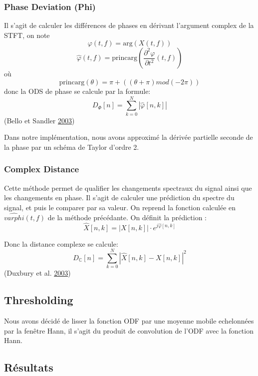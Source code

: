 \documentclass[french,]{article}
\begin{document}
\hypertarget{phase-deviation-phi}{%
\subsubsection{Phase Deviation (Phi)}\label{phase-deviation-phi}}

Il s'agit de calculer les différences de phases en dérivant l'argument
complex de la STFT, on note \[ \varphi(t, f) = \mathrm{arg}(X(t, f)) \]
\[\hat{\varphi}(t, f) = \mathrm{princarg}
\left( \frac{\partial^2 \varphi}{\partial t^2}(t, f)  \right) \] où
\[ \mathrm{princarg}(\theta) = \pi + ((\theta + \pi) mod (-2\pi)) \]
donc la ODS de phase se calcule par la formule:
\[ D_{\Phi}[n] = \sum\limits_{k=0}^{N}\left\lvert \hat{\varphi}[n, k] \right\rvert \]
(Bello et Sandler \protect\hyperlink{ref-phase}{2003})

Dans notre implémentation, nous avons approximé la dérivée partielle
seconde de la phase par un schéma de Taylor d'ordre 2.

\hypertarget{complex-distance}{%
\subsubsection{Complex Distance}\label{complex-distance}}

Cette méthode permet de qualifier les changements spectraux du signal
ainsi que les changements en phase. Il s'agit de calculer une prédiction
du spectre du signal, et puis le comparer par sa valeur. On reprend la
fonction calculée en \(\hat{varphi}(t, f)\) de la méthode précédante. On
définit la prédiction :
\[ \hat{X}[n, k] = \left\lvert X[n, k] \right\rvert \cdot e^{j\hat{\varphi}[n, k]} \]

Donc la distance complexe se calcule:
\[ D_{\mathbb{C}}[n] = \sum\limits_{k=0}^{N} \left\lvert  \hat{X}[n, k] - X[n, k] \right\rvert ^2 \]
(Duxbury et al. \protect\hyperlink{ref-complex}{2003})

\hypertarget{thresholding}{%
\subsection{Thresholding}\label{thresholding}}

Nous avons décidé de lisser la fonction ODF par une moyenne mobile
echelonnées par la fenêtre Hann, il s'agit du produit de convolution de
l'ODF avec la fonction Hann.

\hypertarget{resultats}{%
\subsection{Résultats}\label{resultats}}
\end{document}

